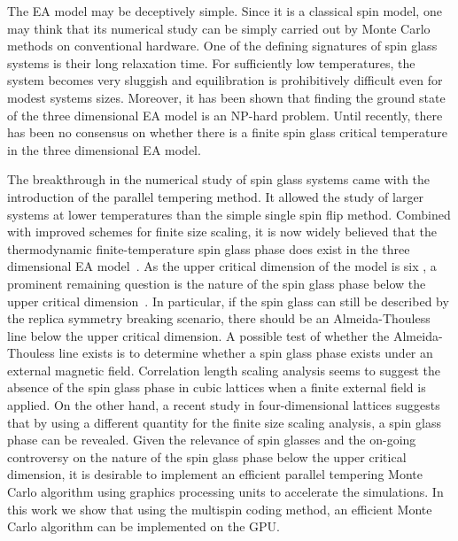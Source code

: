 The EA model may be deceptively simple. Since it is a classical spin 
model, one may think that its numerical study can be simply carried out by Monte 
Carlo methods on conventional hardware. One of the defining signatures of 
spin glass systems is their long relaxation time. For sufficiently low temperatures, the 
system becomes very sluggish and equilibration is prohibitively difficult  
even for modest systems sizes.  Moreover, it has been shown
that finding the ground state of the three dimensional EA model is
an NP-hard problem. \cite{Barahona-1982} Until recently, there has been no %
consensus on whether there is a finite spin glass critical temperature in the three 
dimensional EA model.

The breakthrough in the numerical study of spin glass systems came with the 
introduction of the parallel tempering method. It allowed the study of larger 
systems at lower temperatures than the simple single spin flip %
method. \cite{Swendsen-Wang-1986,Hukushima-Nemoto1996,Marinari-Parisi1992} Combined with 
improved schemes for finite size scaling, it is now widely believed that the thermodynamic 
finite-temperature spin glass phase does exist in the three dimensional EA 
model~\cite{Ballesteros2000}. As the upper critical dimension of the 
model is six \cite{Harris-Lubensky-Chen-1976,Tasaki-1989,Green-Moore-Bray-1983}, a
prominent remaining question is the nature of the 
spin glass phase below the upper critical dimension~\cite{Young-Katzgraber2004}. 
In particular, if the spin glass can still be described by the replica symmetry 
breaking scenario, there should be an Almeida-Thouless line below the upper 
critical dimension. A possible test of whether the Almeida-Thouless 
line exists is to determine whether a spin glass phase exists under an external 
magnetic field. Correlation length scaling analysis seems to suggest the 
absence of the spin glass phase in cubic lattices when a finite external field is applied.\cite{Young-Katzgraber-2004} 
On the other hand, a recent study in four-dimensional lattices suggests that by using a different quantity for the 
finite size scaling analysis, a spin glass phase can be revealed. \cite{Banos2012} 
Given the relevance of spin glasses and the on-going controversy on the nature 
of the spin glass phase below the upper critical dimension, it is desirable to 
implement an efficient parallel tempering Monte Carlo algorithm using 
graphics processing units to accelerate the simulations. In this work we show that 
using the multispin coding method, \cite{Zorn-Herrmann-Rebbi-1981} an efficient Monte Carlo algorithm can be implemented 
on the GPU. 



